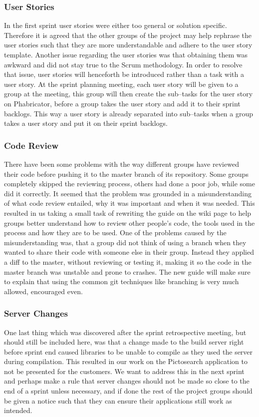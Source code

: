 \subsubsection{User Stories}
In the first sprint user stories were either too general or solution specific.
Therefore it is agreed that the other groups of the project may help rephrase the user stories such that they are more understandable and adhere to the user story template.
Another issue regarding the user stories was that obtaining them was awkward and did not stay true to the Scrum methodology.
In order to resolve that issue, user stories will henceforth be introduced rather than a task with a user story.
At the sprint planning meeting, each user story will be given to a group at the meeting, this group will then create the sub--tasks for the user story on Phabricator, before a group takes the user story and add it to their sprint backlogs.
This way a user story is already separated into sub--tasks when a group takes a user story and put it on their sprint backlogs.

\subsubsection{Code Review}
There have been some problems with the way different groups have reviewed their code before pushing it to the master branch of its repository.
Some groups completely skipped the reviewing process, others had done a poor job, while some did it correctly.
It seemed that the problem was grounded in a misunderstanding of what code review entailed, why it was important and when it was needed.
This resulted in us taking a small task of rewriting the guide on the wiki page to help groups better understand how to review other people's code, the tools used in the process and how they are to be used.
One of the problems caused by the misunderstanding was, that a group did not think of using a branch when they wanted to share their code with someone else in their group.
Instead they applied a diff to the master, without reviewing or testing it, making it so the code in the master branch was unstable and prone to crashes.
The new guide will make sure to explain that using the common git techniques like branching is very much allowed, encouraged even.

\subsubsection{Server Changes}
One last thing which was discovered after the sprint retrospective meeting, but should still be included here, was that a change made to the build server right before sprint end caused libraries to be unable to compile as they used the server during compilation.
This resulted in our work on the Pictosearch application to not be presented for the customers.
We want to address this in the next sprint and perhaps make a rule that server changes should not be made so close to the end of a sprint unless necessary, and if done the rest of the project groups should be given a notice such that they can ensure their applications still work as intended.

